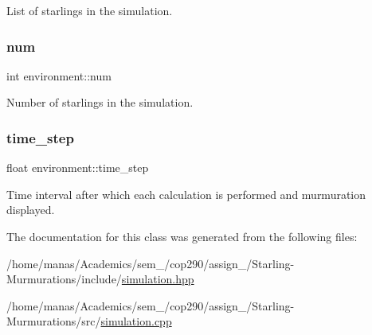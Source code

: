 List of starlings in the simulation. 

\mbox{\label{classenvironment_a0b681df3c52565e6ad6e42baea0c2be8}} 
\subsubsection{\texorpdfstring{num}{num}}
{\footnotesize\ttfamily int environment\+::num}



Number of starlings in the simulation. 

\mbox{\label{classenvironment_af0b9e5c67270c8bc45113bd033f3703d}} 
\subsubsection{\texorpdfstring{time\+\_\+step}{time\_step}}
{\footnotesize\ttfamily float environment\+::time\+\_\+step}



Time interval after which each calculation is performed and murmuration displayed. 



The documentation for this class was generated from the following files\+:\begin{DoxyCompactItemize}
\item 
/home/manas/\+Academics/sem\+\_/cop290/assign\+\_/\+Starling-\/\+Murmurations/include/\mbox{\hyperlink{simulation_8hpp}{simulation.\+hpp}}\item 
/home/manas/\+Academics/sem\+\_/cop290/assign\+\_/\+Starling-\/\+Murmurations/src/\mbox{\hyperlink{simulation_8cpp}{simulation.\+cpp}}\end{DoxyCompactItemize}
